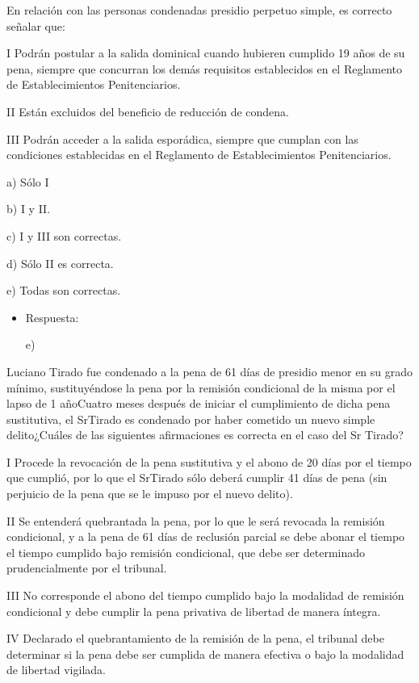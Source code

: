 \documentclass[letterpaper, 11pt]{article}
\begin{document}
En relación con las personas condenadas presidio perpetuo simple, es
correcto señalar que:


I Podrán postular a la salida dominical cuando hubieren cumplido 19
años de su pena, siempre que concurran los demás requisitos
establecidos en el Reglamento de Establecimientos Penitenciarios.

II Están excluidos del beneficio de reducción de condena.

III Podrán acceder a la salida esporádica, siempre que cumplan con las
condiciones establecidas en el Reglamento de Establecimientos
Penitenciarios.


a) Sólo I

b) I y II.


c) I y III son correctas.



d) Sólo II es correcta.


e) Todas son correctas.


\begin{itemize}
\item Respuesta:

e)
\end{itemize}


Luciano Tirado fue condenado a la pena de 61 días de presidio menor en
su grado mínimo, sustituyéndose la pena por la remisión condicional de
la misma por el lapso de 1 añoCuatro meses después de iniciar el
cumplimiento de dicha pena sustitutiva, el SrTirado es condenado por
haber cometido un nuevo simple delito¿Cuáles de las siguientes
afirmaciones es correcta en el caso del Sr Tirado?

I Procede la revocación de la pena sustitutiva y el abono de 20 días
por el tiempo que cumplió, por lo que el SrTirado sólo deberá cumplir
41 días de pena (sin perjuicio de la pena que se le impuso por el
nuevo delito).



II Se entenderá quebrantada la pena, por lo que le será revocada la
remisión condicional, y a la pena de 61 días de reclusión parcial se
debe abonar el tiempo el tiempo cumplido bajo remisión condicional,
que debe ser determinado prudencialmente por el tribunal.


III No corresponde el abono del tiempo cumplido bajo la modalidad de
remisión condicional y debe cumplir la pena privativa de libertad de
manera íntegra.


IV Declarado el quebrantamiento de la remisión de la pena, el tribunal
debe determinar si la pena debe ser cumplida de manera efectiva o bajo
la modalidad de libertad vigilada.
\end{document}
